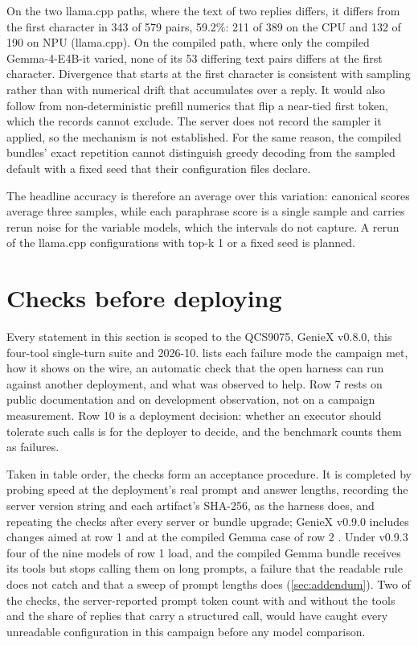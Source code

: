 \documentclass[11pt]{article}
\begin{document}
On the two llama.cpp paths, where the text of two replies differs, it differs from the first character in 343 of 579 pairs, 59.2\%: 211 of 389 on the CPU and 132 of 190 on NPU (llama.cpp). On the compiled path, where only the compiled Gemma-4-E4B-it varied, none of its 53 differing text pairs differs at the first character. Divergence that starts at the first character is consistent with sampling rather than with numerical drift that accumulates over a reply. It would also follow from non-deterministic prefill numerics that flip a near-tied first token, which the records cannot exclude. The server does not record the sampler it applied, so the mechanism is not established. For the same reason, the compiled bundles' exact repetition cannot distinguish greedy decoding from the sampled default with a fixed seed that their configuration files declare.

The headline accuracy is therefore an average over this variation: canonical scores average three samples, while each paraphrase score is a single sample and carries rerun noise for the variable models, which the intervals do not capture. A rerun of the llama.cpp configurations with top-k 1 or a fixed seed is planned.

\section{Checks before deploying}\label{sec:checks}

Every statement in this section is scoped to the QCS9075, GenieX v0.8.0, this four-tool single-turn suite and 2026-10.  lists each failure mode the campaign met, how it shows on the wire, an automatic check that the open harness can run against another deployment, and what was observed to help. Row 7 rests on public documentation \citep{geniexIssue1554} and on development observation, not on a campaign measurement. Row 10 is a deployment decision: whether an executor should tolerate such calls is for the deployer to decide, and the benchmark counts them as failures.

Taken in table order, the checks form an acceptance procedure. It is completed by probing speed at the deployment's real prompt and answer lengths, recording the server version string and each artifact's SHA-256, as the harness does, and repeating the checks after every server or bundle upgrade; GenieX v0.9.0 includes changes aimed at row 1 and at the compiled Gemma case of row 2 \citep{geniex2026,geniexPR1503,geniexPR1525}. Under v0.9.3 four of the nine models of row 1 load, and the compiled Gemma bundle receives its tools but stops calling them on long prompts, a failure that the readable rule does not catch and that a sweep of prompt lengths does (\cref{sec:addendum}). Two of the checks, the server-reported prompt token count with and without the tools and the share of replies that carry a structured call, would have caught every unreadable configuration in this campaign before any model comparison.
\end{document}
